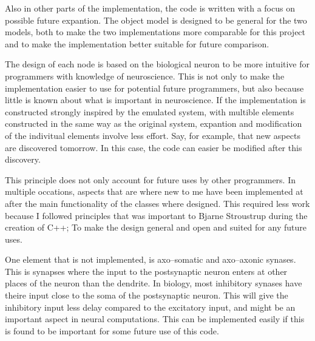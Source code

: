 Also in other parts of the implementation, the code is written with a focus on possible future expantion.
The object model is designed to be general for the two models, both to make the two implementations more comparable for this project and to make the implementation better suitable for future comparison.

The design of each node is based on the biological neuron to be more intuitive for programmers with knowledge of neuroscience. 
This is not only to make the implementation easier to use for potential future programmers, but also because little is known about what is important in neuroscience.
If the implementation is constructed strongly inspired by the emulated system, with multible elements constructed in the same way as the original system, expantion and modification of the indivitual elements involve less effort.
Say, for example, that new aspects are discovered tomorrow. In this case, the code can easier be modified after this discovery.

This principle does not only account for future uses by other programmers.
In multiple occations, aspects that are where new to me have been implemented at after the main functionality of the classes where designed. 
This required less work because I followed principles that was important to Bjarne Stroustrup during the creation of C++; To make the design general and open and suited for any future uses.%


One element that is not implemented, is axo--somatic and axo--axonic synases. 
This is synapses where the input to the postsynaptic neuron enters at other places of the neuron than the dendrite. 
In biology, most inhibitory synases have theire input close to the soma of the postsynaptic neuron. 
This will give the inhibitory input less delay compared to the excitatory input, and might be an important aspect in neural computations.
This can be implemented easily if this is found to be important for some future use of this code.

